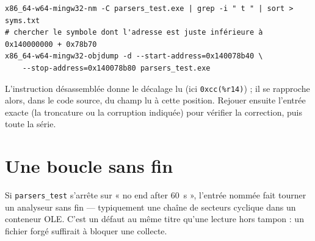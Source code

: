 \documentclass[11pt,a4paper,oneside]{report}
\begin{document}
\begin{lstlisting}
x86_64-w64-mingw32-nm -C parsers_test.exe | grep -i " t " | sort > syms.txt
# chercher le symbole dont l'adresse est juste inférieure à 0x140000000 + 0x78b70
x86_64-w64-mingw32-objdump -d --start-address=0x140078b40 \
    --stop-address=0x140078b80 parsers_test.exe
\end{lstlisting}

L'instruction désassemblée donne le décalage lu (ici \texttt{0xcc(\%r14)}) ; il
se rapproche alors, dans le code source, du champ lu à cette position. Rejouer
ensuite l'entrée exacte (la troncature ou la corruption indiquée) pour vérifier
la correction, puis toute la série.

\section{Une boucle sans fin}

Si \texttt{parsers\_test} s'arrête sur « no end after 60~s », l'entrée nommée
fait tourner un analyseur sans fin — typiquement une chaîne de secteurs cyclique
dans un conteneur OLE. C'est un défaut au même titre qu'une lecture hors tampon :
un fichier forgé suffirait à bloquer une collecte.
\end{document}
